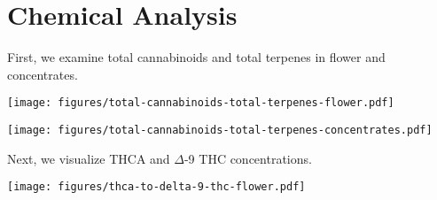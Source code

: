 \documentclass[../article.tex, 12pt]{subfiles}
\begin{document}
\vspace{1\baselineskip}

\noindent%
\begin{minipage}[t]{0.45\textwidth}

    

\end{minipage}\hspace{0.05\textwidth}
%
\begin{minipage}[t]{0.45\textwidth}

    

\end{minipage}


\newpage
\section*{Chemical Analysis}
\label{sec:Chemical Analysis}

First, we examine total cannabinoids and total terpenes in flower and concentrates.

\vspace{2\baselineskip}

\begin{center}
\texttt{[image: figures/total-cannabinoids-total-terpenes-flower.pdf]}
\end{center}

\vspace{2\baselineskip}

\begin{center}
\texttt{[image: figures/total-cannabinoids-total-terpenes-concentrates.pdf]}
\end{center}

\newpage
Next, we visualize THCA and $\Delta$-9 THC concentrations.

\vspace{2\baselineskip}

\begin{center}
\texttt{[image: figures/thca-to-delta-9-thc-flower.pdf]}

\end{center}
\vspace{2\baselineskip}
\end{document}
